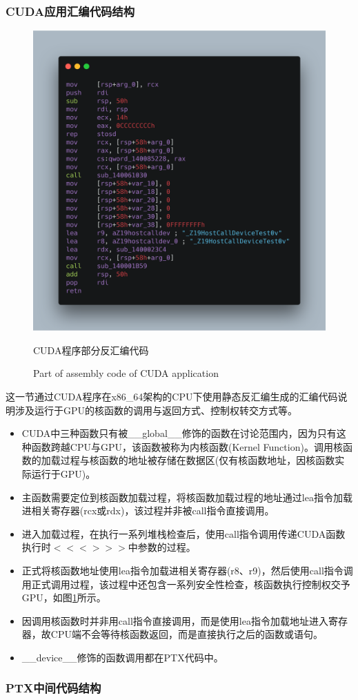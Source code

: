 \subsubsection{CUDA应用汇编代码结构}
\begin{figure}
	\centering
	\includegraphics[width=15cm]{figures/CODE4.png}
	\renewcommand{\thefigure}{\arabic{section}-\arabic{figure} }
	\renewcommand{\figurename}{图}
	\caption{CUDA程序部分反汇编代码}
	\addtocounter{figure}{-1}
	\renewcommand{\thefigure}{\arabic{section}-\arabic{figure} }
	\renewcommand{\figurename}{Figure}
	\caption{Part of assembly code of CUDA application}
	\label{Fig.CUDA-Assembly}
\end{figure}
\par 这一节通过CUDA程序在x86\_64架构的CPU下使用静态反汇编生成的汇编代码说明涉及运行于GPU的核函数的调用与返回方式、控制权转交方式等。
\begin{itemize}
\item CUDA中三种函数只有被\_\_global\_\_修饰的函数在讨论范围内，因为只有这种函数跨越CPU与GPU，该函数被称为内核函数(Kernel Function)。调用核函数的加载过程与核函数的地址被存储在数据区(仅有核函数地址，因核函数实际运行于GPU)。
\item 主函数需要定位到核函数加载过程，将核函数加载过程的地址通过lea指令加载进相关寄存器(rcx或rdx)，该过程并非被call指令直接调用。
\item 进入加载过程，在执行一系列堆栈检查后，使用call指令调用传递CUDA函数执行时$ <<< >>> $中参数的过程。
\item 正式将核函数地址使用lea指令加载进相关寄存器(r8、r9)，然后使用call指令调用正式调用过程，该过程中还包含一系列安全性检查，核函数执行控制权交予GPU，如图\ref{Fig.CUDA-Assembly}所示。
\item 因调用核函数时并非用call指令直接调用，而是使用lea指令加载地址进入寄存器，故CPU端不会等待核函数返回，而是直接执行之后的函数或语句。
\item \_\_device\_\_修饰的函数调用都在PTX代码中。
\end{itemize}

\subsubsection{PTX中间代码结构}